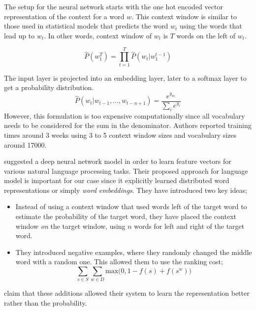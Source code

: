 The setup for the neural network starts with the one hot encoded vector representation of the context for a word $w$.
This context window is similar to those used in statistical models that predicts the word $w_t$ using the words that lead up to $w_t$.
In other words, context window of $w_t$ is $T$ words on the left of $w_t$.

\begin{displaymath}
    \hat{P}(w_1^T) = \prod_{t=1}^{T}\hat{P}(w_t | w_{1}^{t-1})
\end{displaymath}

The input layer is projected into an embedding layer, later to a softmax layer to get a probability distribution.
\begin{equation}%
    \label{eqn:bengio_softmax}
    \hat{P}(w_t|w_{t-1}, \dots, w_{t-n+1}) = \frac{e^{y_{w_{t}}}}{\sum_{i}e^{y_{i}}}
\end{equation}
However, this formulation is too expensive computationally since all vocabulary needs to be considered for the sum in the denominator.
Authors reported training times around 3 weeks using 3 to 5 context window sizes and vocabulary sizes around 17000.

\textcite{collobert_unified_2008} suggested a deep neural network model in order to learn feature vectors for various natural language processing tasks.
Their proposed approach for language model is important for our case since it explicitly learned distributed word representations or simply \emph{word embeddings}.
They have introduced two key ideas;
\begin{itemize}
    \item Instead of using a context window that used words left of the target word to estimate the probability of the target word, they have placed the context window \emph{on} the target window, using $n$ words for left and right of the target word.
    \item They introduced negative examples, where they randomly changed the middle word with a random one. This allowed them to use the ranking cost;
        \begin{displaymath}
            \sum_{s \in S} \sum_{w \in D} \text{max}\big( 0, 1 - f(s) + f(s^w)\big)
        \end{displaymath}
\end{itemize}
\textcite{collobert_unified_2008} claim that these additions allowed their system to learn the representation better rather than the probability.

